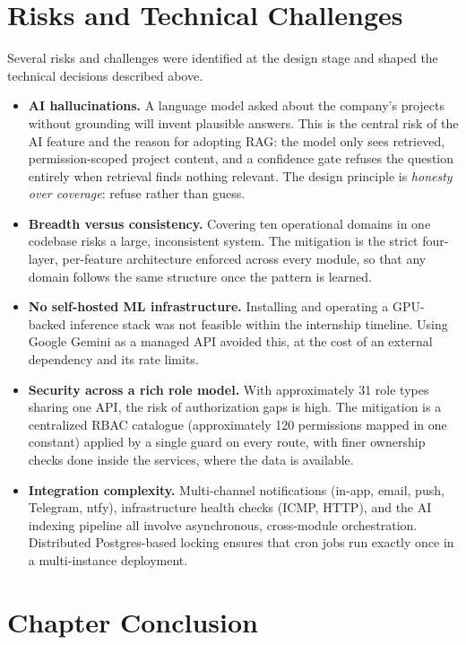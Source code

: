 \section{Risks and Technical Challenges}

Several risks and challenges were identified at the design stage and shaped the technical
decisions described above.

\begin{itemize}
  \item \textbf{AI hallucinations.} A language model asked about the company's projects without
    grounding will invent plausible answers. This is the central risk of the AI feature
    and the reason for adopting RAG: the model only sees retrieved, permission-scoped project
    content, and a confidence gate refuses the question entirely when retrieval finds nothing
    relevant. The design principle is \emph{honesty over coverage}: refuse rather than guess.
  \item \textbf{Breadth versus consistency.} Covering ten operational domains in one codebase
    risks a large, inconsistent system. The mitigation is the strict four-layer, per-feature
    architecture enforced across every module, so that any domain follows the same structure
    once the pattern is learned.
  \item \textbf{No self-hosted ML infrastructure.} Installing and operating a GPU-backed
    inference stack was not feasible within the internship timeline. Using Google Gemini as a
    managed API avoided this, at the cost of an external dependency and its rate limits.
  \item \textbf{Security across a rich role model.} With approximately 31 role types sharing one
    API, the risk of authorization gaps is high. The mitigation is a centralized RBAC catalogue
    (approximately 120 permissions mapped in one constant) applied by a single guard on every
    route, with finer ownership checks done inside the services, where the data is available.
  \item \textbf{Integration complexity.} Multi-channel notifications (in-app, email, push,
    Telegram, ntfy), infrastructure health checks (ICMP, HTTP), and the AI indexing pipeline
    all involve asynchronous, cross-module orchestration. Distributed Postgres-based locking
    ensures that cron jobs run exactly once in a multi-instance deployment.
\end{itemize}

\section{Chapter Conclusion}

